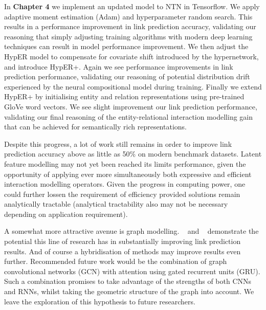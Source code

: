 \noindent In \textbf{Chapter 4} we implement an updated model to NTN in Tensorflow. We apply adaptive moment estimation (Adam) and hyperparameter random search. This results in a performance improvement in link prediction accuracy, validating our reasoning that simply adjusting training algorithms with modern deep learning techniques can result in model performance improvement. We then adjust the HypER model to compensate for covariate shift introduced by the hypernetwork, and introduce HypER+. Again we see performance improvements in link prediction performance, validating our reasoning of potential distribution drift experienced by the neural compositional model during training. Finally we extend HypER+ by initialising entity and relation representations using pre-trained GloVe word vectors. We see slight improvement our link prediction performance, validating our final reasoning of the entity-relational interaction modelling gain that can be achieved for semantically rich representations. \par

\noindent Despite this progress, a lot of work still remains in order to improve link prediction accuracy above as little as 50\% on modern benchmark datasets. Latent feature modelling may not yet been reached its limits performance, given the opportunity of applying ever more simultaneously both expressive and efficient interaction modelling operators. Given the progress in computing power, one could further lossen the requirement of efficiency provided solutions remain analytically tractable (analytical tractability also may not be necessary depending on application requirement).\par

\noindent A somewhat more attractive avenue is graph modelling.  ~\citep{nathani2019learning} and ~\citep{pinter-eisenstein-2018-predicting} demonstrate the potential this line of research has in substantially improving link prediction results. And of course a hybridisation of methods may improve results even further. Recommended future work would be the combination of graph convolutional networks (GCN) with attention using gated recurrent units (GRU). Such a combination promises to take advantage of the strengths of both CNNs and RNNs, whilst taking the geometric structure of the graph into account. We leave the exploration of this hypothesis to future researchers.
